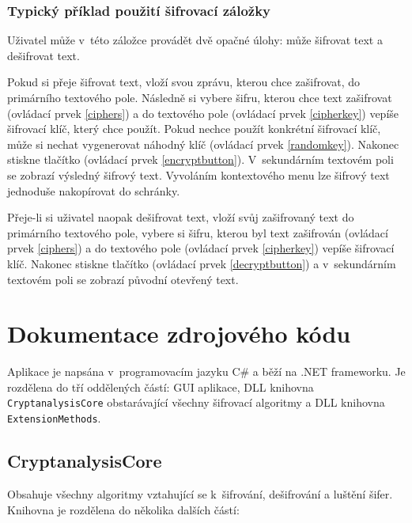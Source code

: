 \documentclass[12pt]{article}
\theoremstyle{definition}
\newcommand{\code}[1]{\texttt{#1}}
\newcommand{\ovl}[1]{(ovládací prvek \ref{#1})}
\begin{document}
\subsubsection{Typický příklad použití šifrovací záložky}
Uživatel může v~této záložce provádět dvě opačné úlohy: může šifrovat text a dešifrovat text. 

Pokud si přeje šifrovat text, vloží svou zprávu, kterou chce zašifrovat, do primárního textového pole. Následně si vybere šifru, kterou chce text zašifrovat \ovl{ciphers} a do textového pole \ovl{cipherkey} vepíše šifrovací klíč, který chce použít. Pokud nechce použít konkrétní šifrovací klíč, může si nechat vygenerovat náhodný klíč (ovládací prvek \ref{randomkey}). Nakonec stiskne tlačítko  \ovl{encryptbutton}. V~sekundárním textovém poli se zobrazí výsledný šifrový text. Vyvoláním kontextového menu lze šifrový text jednoduše nakopírovat do schránky. 

Přeje-li si uživatel naopak dešifrovat text, vloží svůj zašifrovaný text do primárního textového pole, vybere si šifru, kterou byl text zašifrován \ovl{ciphers} a do textového pole \ovl{cipherkey} vepíše šifrovací klíč. Nakonec stiskne tlačítko  \ovl{decryptbutton} a v~sekundárním textovém poli se zobrazí původní otevřený text.



\newpage
\section{Dokumentace zdrojového kódu}
Aplikace je napsána v~programovacím jazyku C\# a běží na .NET frameworku. Je rozdělena do tří oddělených částí: GUI aplikace, DLL knihovna \code{CryptanalysisCore} obstarávající všechny šifrovací algoritmy a DLL knihovna \code{ExtensionMethods}.


\subsection{CryptanalysisCore}
\label{cryptocore}

Obsahuje všechny algoritmy vztahující se k~šifrování, dešifrování a luštění šifer. Knihovna je rozdělena do několika dalších částí:
\end{document}
